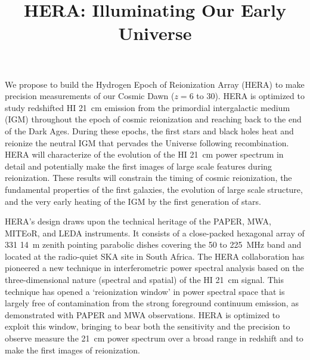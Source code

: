 \documentclass[preprint]{aastex}
\def\HI{{H{\small I }}}
\begin{document}
\pagestyle{empty}

\title{HERA: Illuminating Our Early Universe}


We propose to build the Hydrogen Epoch of Reionization Array (HERA) to make
precision measurements of our Cosmic Dawn ($z=6$ to 30).
HERA is optimized to
study redshifted \HI 21~cm emission from the primordial intergalactic medium (IGM)
throughout the epoch
of cosmic reionization and reaching back to the end of the Dark Ages. During these epochs, the first stars and 
black holes heat and reionize the neutral IGM that pervades the Universe following recombination. 
HERA will characterize of the evolution of the \HI 21~cm power spectrum in detail
and potentially make the first images of large scale features during reionization. 
These results will constrain the timing of cosmic reionization, 
the fundamental properties of the first galaxies, the evolution
of large scale structure, and the very early heating of the IGM by the first generation of stars. 

HERA's design draws upon the technical heritage of the PAPER, MWA, MITEoR, and LEDA instruments. It consists of a close-packed hexagonal array of 331 14~m zenith pointing parabolic dishes covering the 50 to 225~MHz band and located at the radio-quiet SKA site in South Africa. The HERA collaboration has pioneered a new technique in interferometric power spectral
analysis based on the three-dimensional nature (spectral and spatial) of the
\HI 21~cm signal. This technique has opened a `reionization window' in power spectral space that is 
largely free of contamination from the strong foreground continuum emission, as demonstrated with PAPER
and MWA observations. HERA is optimized to 
exploit this window, bringing to bear both
the sensitivity and the precision to observe measure the 21~cm
power spectrum over a broad range in redshift and to make the first images of reionization. 

\end{document}
